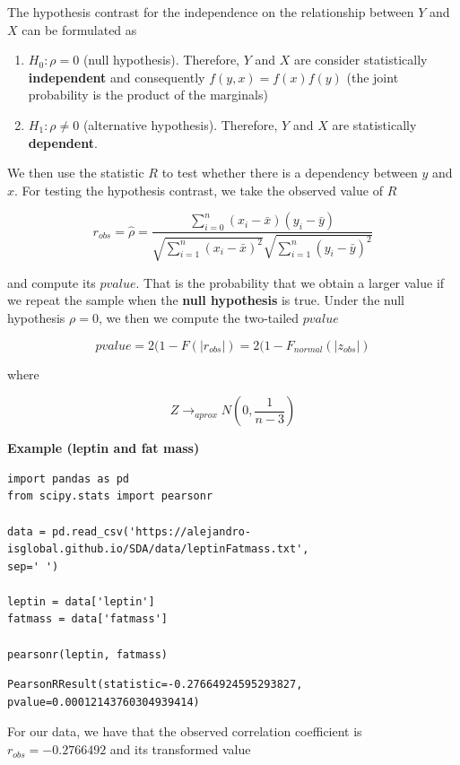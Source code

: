 \documentclass[
]{book}
\begin{document}
The hypothesis contrast for the independence on the relationship between \(Y\) and \(X\) can be formulated as

\begin{enumerate}
\def\labelenumi{\alph{enumi}.}
\item
  \(H_0: \rho=0\) (null hypothesis). Therefore, \(Y\) and \(X\) are consider statistically \textbf{independent} and consequently \(f(y,x)=f(x)f(y)\) (the joint probability is the product of the marginals)
\item
  \(H_1: \rho \neq 0\) (alternative hypothesis). Therefore, \(Y\) and \(X\) are statistically \textbf{dependent}.
\end{enumerate}

We then use the statistic \(R\) to test whether there is a dependency between \(y\) and \(x\). For testing the hypothesis contrast, we take the observed value of \(R\)

\[r_{obs}=\hat{\rho}=\frac{\sum_{i=0}^n(x_i-\bar{x})(y_i-\bar{y})}{\sqrt{\sum_{i=1}^n(x_i-\bar{x})^2}\sqrt{\sum_{i=1}^n(y_i-\bar{y})^2}}\]

and compute its \(pvalue\). That is the probability that we obtain a larger value if we repeat the sample when the \textbf{null hypothesis} is true. Under the null hypothesis \(\rho=0\), we then we compute the two-tailed \(pvalue\)

\[pvalue=2(1- F(|r_{obs}|)= 2(1- F_{normal}(|z_{obs}|)  \]

where

\[Z \rightarrow_{aprox} N(0, \frac{1}{n-3})\]

\textbf{Example (leptin and fat mass)}

\begin{verbatim}
import pandas as pd
from scipy.stats import pearsonr

data = pd.read_csv('https://alejandro-isglobal.github.io/SDA/data/leptinFatmass.txt', 
sep=' ')

leptin = data['leptin']
fatmass = data['fatmass']

pearsonr(leptin, fatmass)
\end{verbatim}

\begin{verbatim}
PearsonRResult(statistic=-0.27664924595293827, pvalue=0.00012143760304939414)
\end{verbatim}

For our data, we have that the observed correlation coefficient is \(r_{obs}=-0.2766492\) and its transformed value
\end{document}
